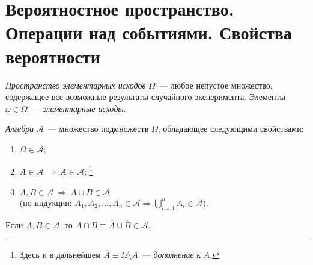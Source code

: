 \section{Вероятностное пространство. Операции над событиями. Свойства вероятности}
\begin{defn}
    \textit{Пространство элементарных исходов} $\Omega$~--- любое непустое множество, содержащее все возможные результаты случайного эксперимента.
    Элементы $\omega \in \Omega$~--- \textit{элементарные исходы}.
\end{defn}

\begin{defn}
\textit{Алгебра} $\mathcal{A}$~--- множество подмножеств $\Omega$, обладающее следующими свойствами:

\begin{enumerate}
    \item 
        $\Omega \in \mathcal{A}$;
    \item 
        $A \in \mathcal{A} \: \Rightarrow \: \overline{A} \in \mathcal{A}$; \footnote{Здесь и в дальнейшем $\overline{A} \equiv \Omega \setminus A$~--- \textit{дополнение} к $A$.}
    \item 
        $A, B \in \mathcal{A} \: \Rightarrow \: A \cup B \in \mathcal{A}$ \\ 
        (по индукции: $A_1, A_2, \ldots, A_n \in \mathcal{A} \Rightarrow \bigcup\limits_{i=1}^n A_i \in \mathcal{A}$).
\end{enumerate}
\end{defn}

\begin{rmrk}
    Если $A, B \in \mathcal{A}$, то $A \cap B \equiv \overline{\overline{A} \cup \overline{B}} \in \mathcal{A}$.
\end{rmrk}

